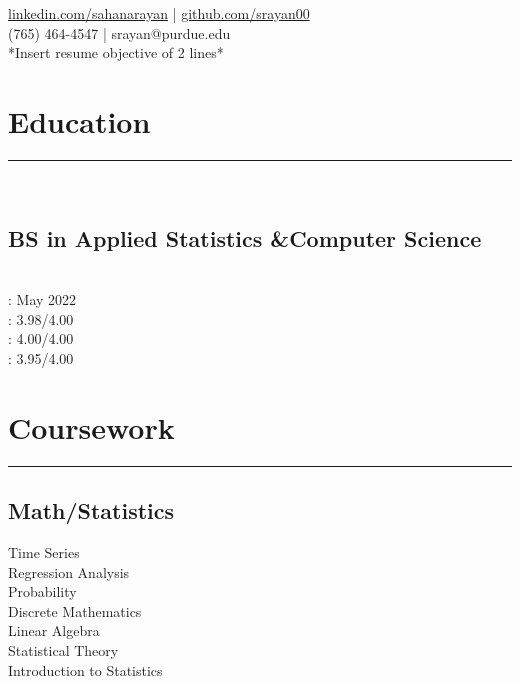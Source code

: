 \documentclass[]{sahana}
\begin{document}
{\href{https://www.linkedin.com/in/sahanarayan}{linkedin.com/sahanarayan} |
 \href{https://github.com/srayan00}{github.com/srayan00}\\
(765) 464-4547 | srayan@purdue.edu \\
*Insert resume objective of 2 lines*\\}
%
%
\begin{minipage}[t]{0.33\textwidth}
\section{Education} 
\noindent\rule{5cm}{0.4pt}\\
\vspace{-8pt}
\subsection{BS in Applied Statistics \&\newline Computer Science}
\\
 : May 2022\\
 : 3.98/4.00\\
 : 4.00/4.00\\
 : 3.95/4.00
\vspace{-5pt}
\sectionsep

\section{Coursework}
\noindent\rule{5cm}{0.4pt}
\subsection{Math/Statistics}
Time Series\\
Regression Analysis\\
Probability\\
Discrete Mathematics\\
Linear Algebra\\
Statistical Theory\\
Introduction to Statistics
\vspace{6pt}

\end{minipage}
\end{document}
